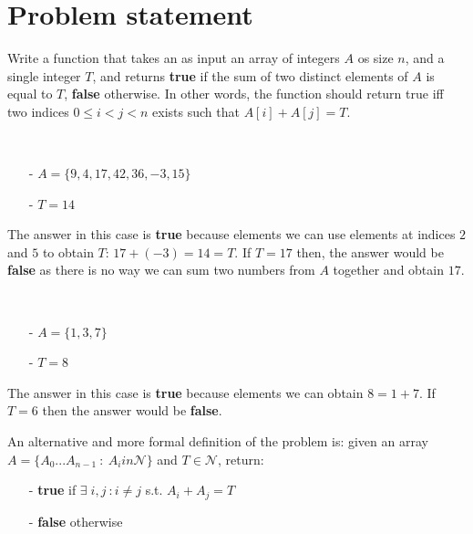 \section{Problem statement}
\begin{exercise}
Write a function that takes an as input an array of integers $A$ os size $n$, and a single integer $T$, and
returns \textbf{true} if the sum of two distinct elements of $A$ is equal to $T$, \textbf{false}
otherwise. In other words, the function should return true iff two indices $ 0 \leq i < j < n$ exists such that $A[i]+A[j] = T$.


\begin{example}
\hfill \\
	\begin{itemize}
		\item[-] 	$A=\{9, 4, 17, 42, 36, -3 ,15\}$
		\item[-] 	$T = 14$
	\end{itemize}
The answer in this case is \textbf{true} because elements we can use elements at indices $2$ and $5$ to obtain $T$: $17+ (-3) = 14 = T$.
If $T=17$ then, the answer would be \textbf{false} as there is no way we can sum two numbers  from $A$ together and
obtain $17$.
\end{example}

\begin{example}
\hfill \\
	\begin{itemize}
		\item[-] 	$A=\{1,3,7\}$
		\item[-] 	$T = 8$
	\end{itemize}
The answer in this case is \textbf{true} because elements we can obtain $8=1+7$. If $T=6$ then the
answer would be \textbf{false}.
\end{example}

An alternative and more formal definition of the problem is: given an array $A=\{A_0...A_{n-1} \: : \: A_i in \mathcal{N}\}$ and $T \in \mathcal{N}$, return:
	\begin{itemize}
		\item[-] \textbf{true} if $\exists \;i,j \: : i \neq j$ s.t. $A_i+A_j = T$
		\item[-] \textbf{false} otherwise
	\end{itemize}
\end{exercise}	


